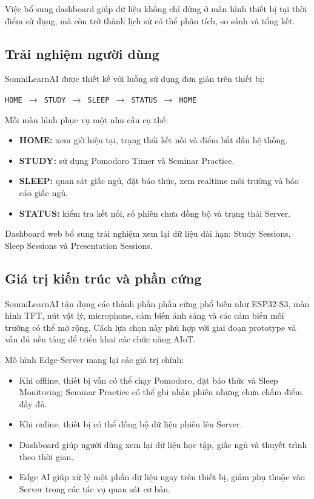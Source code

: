 \documentclass[12pt,a4paper]{article}
\begin{document}
Việc bổ sung dashboard giúp dữ liệu không chỉ dừng ở màn hình thiết bị tại thời điểm sử dụng, mà còn trở thành lịch sử có thể phân tích, so sánh và tổng kết.

\subsection{Trải nghiệm người dùng}

SomniLearnAI được thiết kế với luồng sử dụng đơn giản trên thiết bị:

\begin{center}
\texttt{HOME $\rightarrow$ STUDY $\rightarrow$ SLEEP $\rightarrow$ STATUS $\rightarrow$ HOME}
\end{center}

Mỗi màn hình phục vụ một nhu cầu cụ thể:

\begin{itemize}
    \item \textbf{HOME:} xem giờ hiện tại, trạng thái kết nối và điểm bắt đầu hệ thống.
    \item \textbf{STUDY:} sử dụng Pomodoro Timer và Seminar Practice.
    \item \textbf{SLEEP:} quan sát giấc ngủ, đặt báo thức, xem realtime môi trường và báo cáo giấc ngủ.
    \item \textbf{STATUS:} kiểm tra kết nối, số phiên chưa đồng bộ và trạng thái Server.
\end{itemize}

Dashboard web bổ sung trải nghiệm xem lại dữ liệu dài hạn: Study Sessions, Sleep Sessions và Presentation Sessions.

\subsection{Giá trị kiến trúc và phần cứng}

SomniLearnAI tận dụng các thành phần phần cứng phổ biến như ESP32-S3, màn hình TFT, nút vật lý, microphone, cảm biến ánh sáng và các cảm biến môi trường có thể mở rộng. Cách lựa chọn này phù hợp với giai đoạn prototype và vẫn đủ nền tảng để triển khai các chức năng AIoT.

Mô hình Edge-Server mang lại các giá trị chính:

\begin{itemize}
    \item Khi offline, thiết bị vẫn có thể chạy Pomodoro, đặt báo thức và Sleep Monitoring; Seminar Practice có thể ghi nhận phiên nhưng chưa chấm điểm đầy đủ.
    \item Khi online, thiết bị có thể đồng bộ dữ liệu phiên lên Server.
    \item Dashboard giúp người dùng xem lại dữ liệu học tập, giấc ngủ và thuyết trình theo thời gian.
    \item Edge AI giúp xử lý một phần dữ liệu ngay trên thiết bị, giảm phụ thuộc vào Server trong các tác vụ quan sát cơ bản.
\end{itemize}
\end{document}

